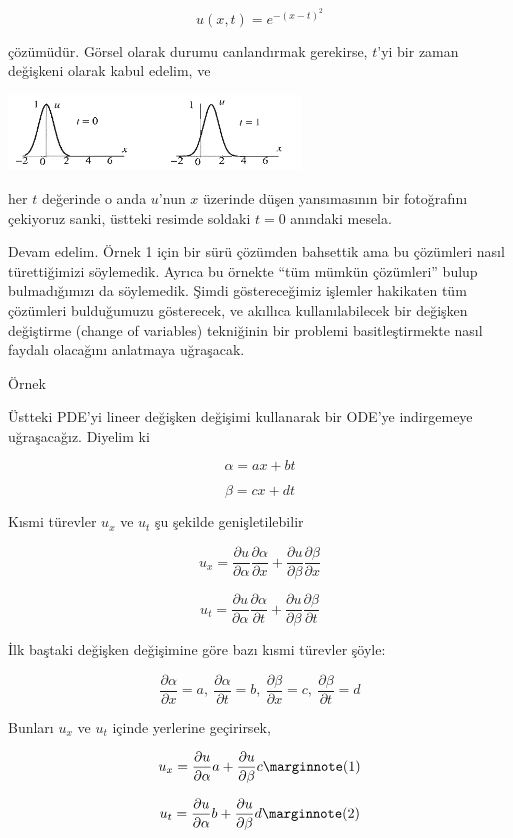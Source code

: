 \documentclass[12pt,fleqn]{article}\usepackage{../../common}
\begin{document}
$$ u(x,t) =  e^{-(x-t)^2} $$

çözümüdür. Görsel olarak durumu canlandırmak gerekirse, $t$'yi bir zaman
değişkeni olarak kabul edelim, ve 

\includegraphics[height=2cm]{1_3.png}

her $t$ değerinde o anda $u$'nun $x$ üzerinde düşen yansımasının bir
fotoğrafını çekiyoruz sanki, üstteki resimde soldaki $t=0$ anındaki
mesela. 

Devam edelim. Örnek 1 için bir sürü çözümden bahsettik ama bu çözümleri
nasıl türettiğimizi söylemedik. Ayrıca bu örnekte ``tüm mümkün çözümleri''
bulup bulmadığımızı da söylemedik. Şimdi göstereceğimiz işlemler hakikaten
tüm çözümleri bulduğumuzu gösterecek, ve akıllıca kullanılabilecek bir
değişken değiştirme (change of variables) tekniğinin bir problemi
basitleştirmekte nasıl faydalı olacağını anlatmaya uğraşacak. 

Örnek

Üstteki PDE'yi lineer değişken değişimi kullanarak bir ODE'ye indirgemeye
uğraşacağız. Diyelim ki

$$ \alpha = a x + b t $$

$$ \beta = cx + dt $$

Kısmi türevler $u_x$ ve $u_t$ şu şekilde genişletilebilir

$$ u_x = 
\frac{\partial u}{\partial \alpha}\frac{\partial \alpha}{\partial x}  +
\frac{\partial u}{\partial \beta}\frac{\partial \beta}{\partial x} 
$$


$$ u_t = 
\frac{\partial u}{\partial \alpha}\frac{\partial \alpha}{\partial t}  +
\frac{\partial u}{\partial \beta}\frac{\partial \beta}{\partial t} 
$$

İlk baştaki değişken değişimine göre bazı kısmi türevler şöyle:

$$ \frac{\partial \alpha}{\partial x} = a , \ \frac{\partial \alpha}{\partial t} = b, \ \frac{\partial \beta}{\partial x} = c , \
\frac{\partial \beta}{\partial t} = d 
$$

Bunları $u_x$ ve $u_t$ içinde yerlerine geçirirsek,

$$ u_x = 
\frac{\partial u}{\partial \alpha} a +
\frac{\partial u}{\partial \beta} c
\mlabel{1}
$$

$$ u_t = 
\frac{\partial u}{\partial \alpha} b +
\frac{\partial u}{\partial \beta} d
\mlabel{2}
$$
\end{document}
